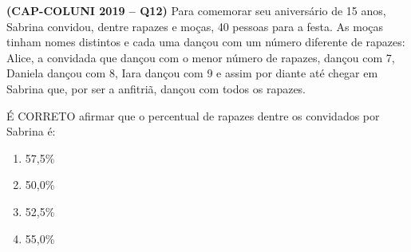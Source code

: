 \textbf{(CAP-COLUNI 2019 -- Q12)} Para comemorar seu aniversário de 15 anos, Sabrina convidou, dentre rapazes e moças, 40 pessoas para a festa. As moças tinham nomes distintos e cada uma dançou com um número diferente de rapazes: Alice, a convidada que dançou com o menor número de rapazes, dançou com 7, Daniela dançou com 8, Iara dançou com 9 e assim por diante até chegar em Sabrina que, por ser a anfitriã, dançou com todos os rapazes.

É CORRETO afirmar que o percentual de rapazes dentre os convidados por Sabrina é:

\begin{enumerate}
	\item 57,5\%
	\item 50,0\%
	\item 52,5\%
	\item 55,0\%
\end{enumerate}
